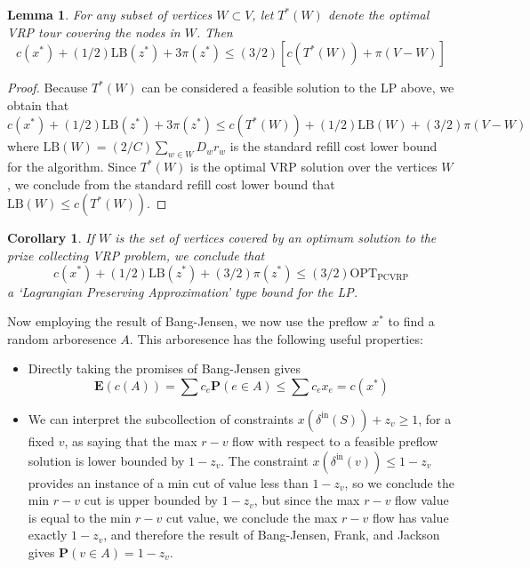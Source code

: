 \documentclass{article}
\theoremstyle{plain}
\newtheorem{lemma}{Lemma}
\newtheorem*{corollary}{Corollary}
\theoremstyle{plain}
\begin{document}
\begin{lemma}\label{thm:VRPTourBound}
    For any subset of vertices $W \subset V$, let $T^*(W)$ denote the optimal VRP tour covering the nodes in $W$. Then
    \[ c(x^*) + (1/2)\text{LB}(z^*) + 3\pi(z^*) \leq (3/2)[c(T^*(W)) + \pi(V-W)] \]
\end{lemma}
\begin{proof}
    Because $T^*(W)$ can be considered a feasible solution to the LP above, we obtain that
    \[ c(x^*) + (1/2) \text{LB}(z^*) + 3 \pi(z^*) \leq c(T^*(W)) + (1/2) \text{LB}(W) + (3/2) \pi(V - W) \]
    where $\text{LB}(W) = (2/C) \sum_{w \in W} D_wr_w$ is the standard refill cost lower bound for the algorithm. Since $T^*(W)$ is the optimal VRP solution over the vertices $W$, we conclude from the standard refill cost lower bound that $\text{LB}(W) \leq c(T^*(W))$.
\end{proof}

\begin{corollary}
    If $W$ is the set of vertices covered by an optimum solution to the prize collecting VRP problem, we conclude that
    \[ c(x^*) + (1/2) \text{LB}(z^*) + (3/2) \pi(z^*) \leq (3/2) \text{OPT}_{\text{PCVRP}} \]
    a `Lagrangian Preserving Approximation' type bound for the LP.
\end{corollary}

Now employing the result of Bang-Jensen, we now use the preflow $x^*$ to find a random arboresence $A$. This arboresence has the following useful properties:
%
\begin{itemize}
    \item Directly taking the promises of Bang-Jensen gives
    \[ \mathbf{E}(c(A)) = \sum c_e \mathbf{P}(e \in A) \leq \sum c_e x_e = c(x^*) \]

    \item We can interpret the subcollection of constraints $x(\delta^{\text{in}}(S)) + z_v \geq 1$, for a fixed $v$, as saying that the max $r-v$ flow with respect to a feasible preflow solution is lower bounded by $1 - z_v$. The constraint $x(\delta^{\text{in}}(v)) \leq 1 - z_v$ provides an instance of a min cut of value less than $1 - z_v$, so we conclude the min $r-v$ cut is upper bounded by $1 - z_v$, but since the max $r-v$ flow value is equal to the min $r-v$ cut value, we conclude the max $r-v$ flow has value exactly $1 - z_v$, and therefore the result of Bang-Jensen, Frank, and Jackson gives $\mathbf{P}(v \in A) = 1 - z_v$.

\end{itemize}
\end{document}
